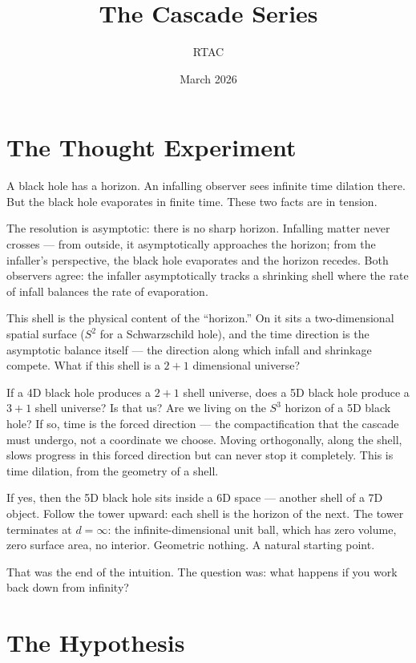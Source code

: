 \documentclass[12pt,a4paper]{article}
\title{\textbf{The Cascade Series}}
\author{RTAC}
\date{March 2026}
\begin{document}
\maketitle
\thispagestyle{empty}

\section*{The Thought Experiment}

A black hole has a horizon. An infalling observer sees infinite time dilation there.
But the black hole evaporates in finite time. These two facts are in tension.

The resolution is asymptotic: there is no sharp horizon. Infalling matter never
crosses --- from outside, it asymptotically approaches the horizon; from the infaller's
perspective, the black hole evaporates and the horizon recedes. Both observers agree:
the infaller asymptotically tracks a shrinking shell where the rate of infall balances
the rate of evaporation.

This shell is the physical content of the ``horizon.'' On it sits a two-dimensional
spatial surface ($S^2$ for a Schwarzschild hole), and the time direction is the asymptotic
balance itself --- the direction along which infall and shrinkage compete. What if
this shell is a $2 + 1$ dimensional universe?

If a 4D black hole produces a $2 + 1$ shell universe, does a 5D black hole produce
a $3 + 1$ shell universe? Is that us? Are we living on the $S^3$ horizon of a 5D black
hole? If so, time is the forced direction --- the compactification that the cascade
must undergo, not a coordinate we choose. Moving orthogonally, along the shell,
slows progress in this forced direction but can never stop it completely. This is time
dilation, from the geometry of a shell.

If yes, then the 5D black hole sits inside a 6D space --- another shell of a 7D object.
Follow the tower upward: each shell is the horizon of the next. The tower terminates
at $d = \infty$: the infinite-dimensional unit ball, which has zero volume, zero surface
area, no interior. Geometric nothing. A natural starting point.

That was the end of the intuition. The question was: what happens if you work
back down from infinity?

\section*{The Hypothesis}
\end{document}
